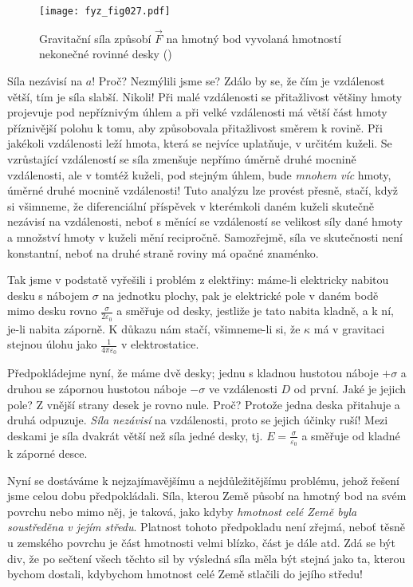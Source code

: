     \begin{figure}[ht!]  %
      \centering
      \texttt{[image: fyz\_fig027.pdf]}
      \caption{Gravitační síla způsobí \(\vec{F}\) na hmotný bod vyvolaná hmotností nekonečné 
               rovinné desky (\cite[s.~195]{Feynman01})}
      \label{fyz:fig027}
    \end{figure}
    Síla nezávisí na \(a\)! Proč? Nezmýlili jsme se? Zdálo by se, že čím je vzdálenost větší, tím 
    je síla slabší. Nikoli! Při malé vzdálenosti se přitažlivost většiny hmoty projevuje pod 
    nepříznivým úhlem a při velké vzdálenosti má větší část hmoty příznivější polohu k tomu, aby 
    způsobovala přitažlivost směrem k rovině. Při jakékoli vzdálenosti leží hmota, která se nejvíce 
    uplatňuje, v určitém kuželi. Se vzrůstající vzdáleností se síla zmenšuje nepřímo úměrně druhé 
    mocnině vzdálenosti, ale v tomtéž kuželi, pod stejným úhlem, bude \emph{mnohem víc} hmoty, 
    úměrné druhé mocnině vzdálenosti! Tuto analýzu lze provést přesně, stačí, když si všimneme, že 
    diferenciální příspěvek v kterémkoli daném kuželi skutečně nezávisí na vzdálenosti, neboť s 
    měnící se vzdáleností se velikost síly dané hmoty a množství hmoty v kuželi mění recipročně. 
    Samozřejmě, síla ve skutečnosti není konstantní, neboť na druhé straně roviny má opačné 
    znaménko.
    
   Tak jsme v podstatě vyřešili i problém z elektřiny: máme-li elektricky nabitou desku s nábojem 
    \(\sigma\) na jednotku plochy, pak je elektrické pole v daném bodě mimo desku rovno 
    \(\frac{\sigma}{2\varepsilon_0}\) a směřuje od desky, jestliže je tato nabita kladně, a k ní, 
    je-li nabita záporně. K důkazu nám stačí, všimneme-li si, že \(\kappa\) má v gravitaci stejnou 
    úlohu jako \(\frac{1}{4\pi\varepsilon_0}\) v elektrostatice.
    
    Předpokládejme nyní, že máme dvě desky; jednu s kladnou hustotou náboje \(+\sigma\) a druhou se 
    zápornou hustotou náboje \(-\sigma\) ve vzdálenosti \(D\) od první. Jaké je jejich pole? Z 
    vnější strany desek je rovno nule. Proč? Protože jedna deska přitahuje a druhá odpuzuje. 
    \emph{Síla nezávisí} na vzdálenosti, proto se jejich účinky ruší! Mezi deskami je síla dvakrát 
    větší než síla jedné desky, tj. \(E = \frac{\sigma}{\varepsilon_0}\) a směřuje od kladné k 
    záporné desce.
    
    Nyní se dostáváme k nejzajímavějšímu a nejdůležitějšímu problému, jehož řešení jsme celou dobu 
    předpokládali. Síla, kterou Země působí na hmotný bod na svém povrchu nebo mimo něj, je taková, 
    jako kdyby \emph{hmotnost celé Země byla soustředěna v jejím středu}. Platnost tohoto 
    předpokladu není zřejmá, neboť těsně u zemského povrchu je část hmotnosti velmi blízko, část je 
    dále atd. Zdá se být div, že po sečtení všech těchto sil by výsledná síla měla být stejná jako 
    ta, kterou bychom dostali, kdybychom hmotnost celé Země stlačili do jejího středu!
    
